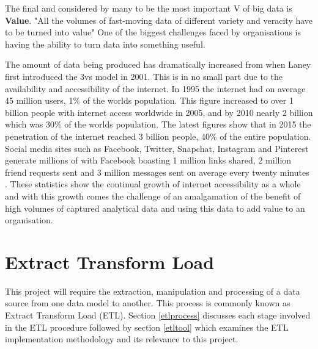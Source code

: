 The final and considered by many to be the most important V of big data is \textbf{Value}. "All the volumes of fast-moving data of different variety and veracity have to be turned into value" \cite{ibm} One of the biggest challenges faced by organisations is having the ability to turn data into something useful.

The amount of data being produced has dramatically increased from when Laney first introduced the 3vs model in 2001. This is in no small part due to the availability and accessibility of the internet. In 1995 the internet had on average 45 million users, 1\% of the worlds population. This figure increased to over 1 billion people with internet access worldwide in 2005, and by 2010 nearly 2 billion which was 30\% of the worlds population. The latest figures show that in 2015 the penetration of the internet reached 3 billion people, 40\% of the entire population. Social media sites such as Facebook, Twitter, Snapchat, Instagram and Pinterest generate millions of  with Facebook boasting 1 million links shared, 2 million friend requests sent and 3 million messages sent on average every twenty minutes \cite{statref}. These statistics show the continual growth of internet accessibility as a whole and with this growth comes the challenge of an amalgamation of the benefit of high volumes of captured analytical data and using this data to add value to an organisation.

\section{Extract Transform Load}\label{etl}
This project will require the extraction, manipulation and processing of a data source from one data model to another. This process is commonly known as Extract Transform Load (ETL). Section \ref{etlprocess} discusses each stage involved in the ETL procedure followed by section \ref{etltool} which examines the ETL implementation methodology and its relevance to this project. 

